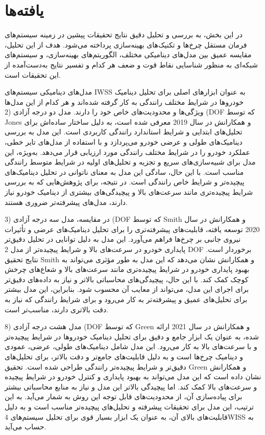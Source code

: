 \documentclass[a4paper,10pt]{article}
\begin{document}
    \section{یافته‌ها}

        در این بخش، به بررسی و تحلیل دقیق نتایج تحقیقات پیشین در زمینه سیستم‌های فرمان مستقل چرخ‌ها و تکنیک‌های بهینه‌سازی پرداخته می‌شود. هدف از این تحلیل، مقایسه عمیق بین مدل‌های دینامیکی مختلف، الگوریتم‌های بهینه‌سازی، و سیستم‌های شبکه‌ای به منظور شناسایی نقاط قوت و ضعف هر کدام و تفسیر نتایج به‌دست‌آمده از این تحقیقات است.

        مدل‌های دینامیکی سیستم‌های IWSS به عنوان ابزارهای اصلی برای تحلیل دینامیک خودروها در شرایط مختلف رانندگی به کار گرفته شده‌اند و هر کدام از این مدل‌ها ویژگی‌ها و محدودیت‌های خاص خود را دارند. مدل دو درجه آزادی (2 (DOF که توسط Jones و همکارانش در سال 2019 معرفی شده است، به دلیل ساختار ساده‌اش برای تحلیل‌های ابتدایی و شرایط استاندارد رانندگی کاربردی است. این مدل به بررسی دینامیک‌های طولی و عرضی خودرو می‌پردازد و با استفاده از مدل‌های تایر خطی، عملکرد خودرو را در شرایط مختلف رانندگی مورد ارزیابی قرار می‌دهد. به‌ویژه، این مدل برای شبیه‌سازی‌های سریع و تجزیه و تحلیل‌های اولیه در شرایط متوسط رانندگی مناسب است. با این حال، سادگی این مدل به معنای ناتوانی در تحلیل دینامیک‌های پیچیده‌تر و شرایط خاص رانندگی است. در نتیجه، برای پژوهش‌هایی که به بررسی شرایط پیچیده‌تری مانند سرعت‌های بالا و پیچیدگی‌های بیشتری از دینامیک خودرو نیاز دارند، مدل‌های پیشرفته‌تر ضروری هستند.

        در مقایسه، مدل سه درجه آزادی (3 (DOF که توسط Smith و همکارانش در سال 2020 توسعه یافته، قابلیت‌های پیشرفته‌تری را برای تحلیل دینامیک‌های عرضی و تأثیرات نیروی جانبی بر چرخ‌ها فراهم می‌آورد. این مدل به دلیل توانایی در تحلیل دقیق‌تر پایداری خودرو در سرعت‌های بالا و شرایط پیچیده‌تر از مدل 2 DOF برخوردار است. نتایج تحقیق Smith و همکارانش نشان می‌دهد که این مدل به طور مؤثری می‌تواند به بهبود پایداری خودرو در شرایط پیچیده‌تری مانند سرعت‌های بالا و شعاع‌های چرخش کوچک کمک کند. با این حال، پیچیدگی‌های محاسباتی بالاتر و نیاز به داده‌های دقیق‌تر برای اجرای این مدل، می‌تواند از معایب آن محسوب شود. بنابراین، این مدل بیشتر برای تحلیل‌های عمیق و پیشرفته‌تر به کار می‌رود و برای شرایط رانندگی که نیاز به دقت بالاتری دارند، مناسب‌تر است.

        مدل هشت درجه آزادی (8 (DOF که توسط Green و همکارانش در سال 2021 ارائه شده، به عنوان یک ابزار جامع و دقیق برای تحلیل دینامیک خودروها در شرایط پیچیده‌تر و با سرعت‌های بالا به کار می‌رود. این مدل شامل دینامیک‌های طولی، عرضی، عمودی و دینامیک چرخ‌ها است و به دلیل قابلیت‌های جامع‌تر و دقت بالاتر، برای تحلیل‌های دقیق‌تر و شرایط پیچیده‌تر رانندگی طراحی شده است. تحقیق Green و همکارانش نشان داده است که این مدل می‌تواند به بهبود پایداری و کنترل خودرو در شرایط پیچیده و سرعت‌های بالا کمک کند. اما پیچیدگی بالاتر این مدل و نیاز به منابع محاسباتی بیشتر برای پیاده‌سازی آن، از محدودیت‌های قابل توجه این روش به شمار می‌آید. به این ترتیب، این مدل برای تحقیقات پیشرفته و تحلیل‌های پیچیده‌تر مناسب است و به دلیل قابلیت‌های بالای آن، به عنوان یک ابزار بسیار قوی برای تحلیل سیستم‌های 4WISS به حساب می‌آید.
\end{document}
